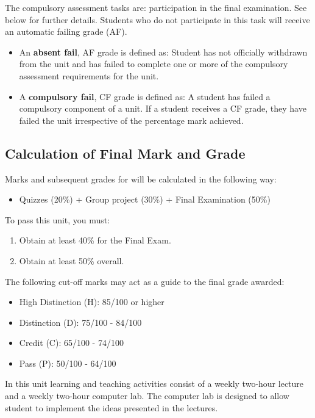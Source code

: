 \documentclass{uws_learning_guide}
\begin{document}
The compulsory assessment tasks are: participation in the final
examination. See below for further details. Students who do not
participate in this task will receive an automatic failing grade
(AF).
\begin{itemize}
\item An \textbf{absent fail}, AF grade is defined as: Student has not
officially withdrawn from the unit and has failed to complete one or
more of the compulsory assessment requirements for the unit.

\item A \textbf{compulsory fail}, CF grade is defined as: A student has
failed a compulsory component of a unit. If a student receives a CF
grade, they have failed the unit irrespective of the percentage mark
achieved.
\end{itemize}

\subsection{Calculation of Final Mark and Grade}

Marks and subsequent grades for \printunitnumber{} \printunitname{} will be
calculated in the following way:
\begin{itemize}
\item
  Quizzes (20\%) + Group project (30\%) + Final Examination (50\%)
\end{itemize}

To pass this unit, you must:
\begin{enumerate}
\item Obtain at least 40\% for the Final Exam.
\item Obtain at least 50\% overall.
\end{enumerate}

The following cut-off marks may act as a guide to the final grade awarded:
\begin{itemize}
\item High Distinction (H):            85/100 or higher
\item Distinction (D):                 75/100 - 84/100
\item Credit (C):                      65/100 - 74/100
\item Pass (P):                        50/100 - 64/100
\end{itemize}
In this unit learning and teaching activities consist of a weekly
two-hour lecture and a weekly two-hour computer lab. The computer lab
is designed to allow student to implement the ideas presented in the
lectures.
\end{document}
